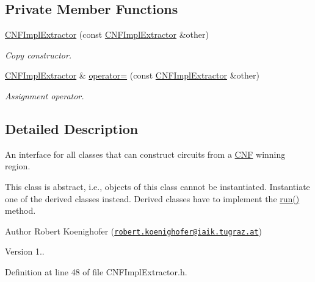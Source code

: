 \subsection*{Private Member Functions}
\begin{DoxyCompactItemize}
\item 
\hyperlink{classCNFImplExtractor_a35f00109eac31d5343afb0ceda402e1e}{C\-N\-F\-Impl\-Extractor} (const \hyperlink{classCNFImplExtractor}{C\-N\-F\-Impl\-Extractor} \&other)
\begin{DoxyCompactList}\small\item\em Copy constructor. \end{DoxyCompactList}\item 
\hyperlink{classCNFImplExtractor}{C\-N\-F\-Impl\-Extractor} \& \hyperlink{classCNFImplExtractor_ac67f96743ec6f24fe6c3f1d9f4f85964}{operator=} (const \hyperlink{classCNFImplExtractor}{C\-N\-F\-Impl\-Extractor} \&other)
\begin{DoxyCompactList}\small\item\em Assignment operator. \end{DoxyCompactList}\end{DoxyCompactItemize}


\subsection{Detailed Description}
An interface for all classes that can construct circuits from a \hyperlink{classCNF}{C\-N\-F} winning region. 

This class is abstract, i.\-e., objects of this class cannot be instantiated. Instantiate one of the derived classes instead. Derived classes have to implement the \hyperlink{classCNFImplExtractor_a8251ce58869f9f8ded159f1fa07ab334}{run()} method.

\begin{DoxyAuthor}{Author}
Robert Koenighofer (\href{mailto:robert.koenighofer@iaik.tugraz.at}{\tt robert.\-koenighofer@iaik.\-tugraz.\-at}) 
\end{DoxyAuthor}
\begin{DoxyVersion}{Version}
1.. 
\end{DoxyVersion}


Definition at line 48 of file C\-N\-F\-Impl\-Extractor.\-h.



